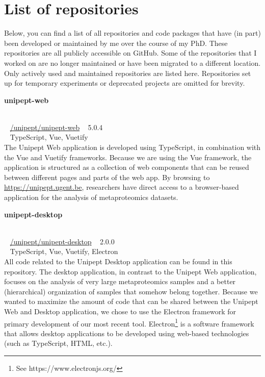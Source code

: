 \chapter*{List of repositories}

Below, you can find a list of all repositories and code packages that have (in part) been developed or maintained by me over the course of my PhD.
These repositories are all publicly accessible on GitHub.
Some of the repositories that I worked on are no longer maintained or have been migrated to a different location.
Only actively used and maintained repositories are listed here.
Repositories set up for temporary experiments or deprecated projects are omitted for brevity.

\begin{large}\textbf{\textsf{unipept-web}}\end{large} \\
\faGithub ~ \href{https://github.com/unipept/unipept-web}{\textsf{/unipept/unipept-web}} \hfill \faTag ~ \textsf{5.0.4} \\
\faCode ~ \textsf{TypeScript, Vue, Vuetify} \\
The Unipept Web application is developed using TypeScript, in combination with the Vue and Vuetify frameworks.
Because we are using the Vue framework, the application is structured as a collection of web components that can be reused between different pages and parts of the web app.
By browsing to \href{https://unipept.ugent.be}{https://unipept.ugent.be}, researchers have direct access to a browser-based application for the analysis of metaproteomics datasets.

\begin{large}\textbf{\textsf{unipept-desktop}}\end{large} \\
\faGithub ~ \href{https://github.com/unipept/unipept-desktop}{\textsf{/unipept/unipept-desktop}} \hfill \faTag ~ \textsf{2.0.0} \\
\faCode ~ \textsf{TypeScript, Vue, Vuetify, Electron} \\
All code related to the Unipept Desktop application can be found in this repository.
The desktop application, in contrast to the Unipept Web application, focuses on the analysis of very large metaproteomics samples and a better (hierarchical) organization of samples that somehow belong together.
Because we wanted to maximize the amount of code that can be shared between the Unipept Web and Desktop application, we chose to use the Electron framework for primary development of our most recent tool.
Electron\footnote{See https://www.electronjs.org/} is a software framework that allows desktop applications to be developed using web-based technologies (such as TypeScript, HTML, etc.).

